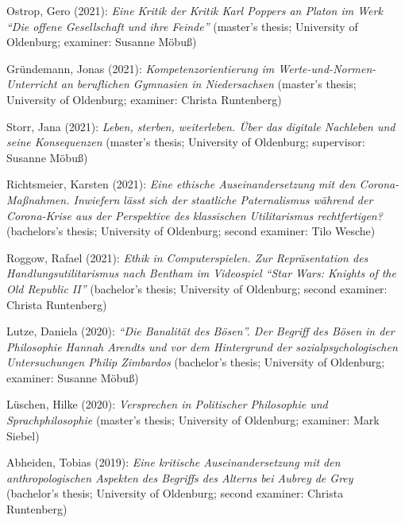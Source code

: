 \documentclass[a4paper,10pt]{article}
\newenvironment{literature}{%
   \parskip6pt\parindent0pt\raggedright
   \def\lititem{\hangindent=1cm\hangafter1}}{%
   \par\ignorespaces}
\begin{document}
\begin{literature}
\lititem Ostrop, Gero (2021): \textit{Eine Kritik der Kritik Karl Poppers an Platon im Werk \enquote{Die offene Gesellschaft und ihre Feinde}} (master's thesis; University of Oldenburg; examiner: Susanne Möbuß)

\lititem Gründemann, Jonas (2021): \textit{Kompetenzorientierung im Werte-und-Normen-Unterricht an beruflichen Gymnasien in Niedersachsen} (master's thesis; University of Oldenburg; examiner: Christa Runtenberg)

\lititem Storr, Jana (2021): \textit{Leben, sterben, weiterleben. Über das digitale Nachleben und seine Konsequenzen} (master's thesis; University of Oldenburg; supervisor: Susanne Möbuß)

\lititem Richtsmeier, Karsten (2021): \textit{Eine ethische Auseinandersetzung mit den Corona-Maßnahmen. Inwiefern lässt sich der staatliche Paternalismus während der Corona-Krise aus der Perspektive des klassischen Utilitarismus rechtfertigen?} (bachelors's thesis; University of Oldenburg; second examiner: Tilo Wesche)

\lititem Roggow, Rafael (2021): \textit{Ethik in Computerspielen. Zur Repräsentation des Handlungsutilitarismus nach Bentham im Videospiel \enquote{Star Wars: Knights of the Old Republic II}} (bachelor's thesis; University of Oldenburg; second examiner: Christa Runtenberg)

\lititem Lutze, Daniela (2020): \textit{\enquote{Die Banalität des Bösen}. Der Begriff des Bösen in der Philosophie Hannah Arendts und vor dem Hintergrund der sozialpsychologischen Untersuchungen Philip Zimbardos} (bachelor's thesis; University of Oldenburg; examiner: Susanne Möbuß)

\lititem Lüschen, Hilke (2020): \textit{Versprechen in Politischer Philosophie und Sprachphilosophie} (master's thesis; University of Oldenburg; examiner: Mark Siebel)

\lititem Abheiden, Tobias (2019): \textit{Eine kritische Auseinandersetzung mit den anthropologischen Aspekten des Begriffs des Alterns bei Aubrey de Grey} (bachelor's thesis; University of Oldenburg; second examiner: Christa Runtenberg)
\end{literature}


\clearpage
\end{document}
